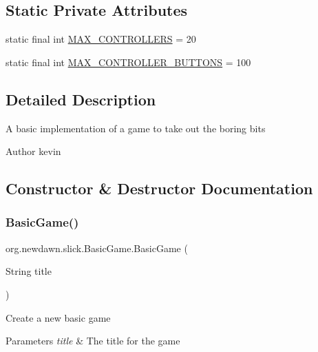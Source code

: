 \subsection*{Static Private Attributes}
\begin{DoxyCompactItemize}
\item 
static final int \mbox{\hyperlink{classorg_1_1newdawn_1_1slick_1_1_basic_game_ae6a83ff9654d52fa13678d974cf80b27}{M\+A\+X\+\_\+\+C\+O\+N\+T\+R\+O\+L\+L\+E\+RS}} = 20
\item 
static final int \mbox{\hyperlink{classorg_1_1newdawn_1_1slick_1_1_basic_game_a87e5dc92b0b1138bfa8d11d2f6c6ac70}{M\+A\+X\+\_\+\+C\+O\+N\+T\+R\+O\+L\+L\+E\+R\+\_\+\+B\+U\+T\+T\+O\+NS}} = 100
\end{DoxyCompactItemize}


\subsection{Detailed Description}
A basic implementation of a game to take out the boring bits

\begin{DoxyAuthor}{Author}
kevin 
\end{DoxyAuthor}


\subsection{Constructor \& Destructor Documentation}
\mbox{\label{classorg_1_1newdawn_1_1slick_1_1_basic_game_a92a9b820871d0be8c00add4ed23dae9c}} 
\subsubsection{\texorpdfstring{Basic\+Game()}{BasicGame()}}
{\footnotesize\ttfamily org.\+newdawn.\+slick.\+Basic\+Game.\+Basic\+Game (\begin{DoxyParamCaption}\item[{String}]{title }\end{DoxyParamCaption})\hspace{0.3cm}{\ttfamily [inline]}}

Create a new basic game


\begin{DoxyParams}{Parameters}
{\em title} & The title for the game \\
\hline
\end{DoxyParams}

